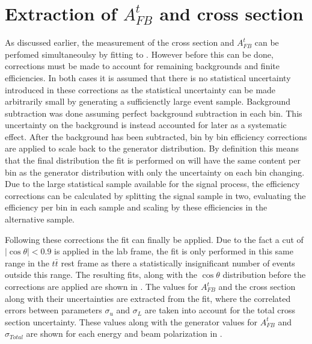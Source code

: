 \section{Extraction of $A_{FB}^t$ and cross section}
As discussed earlier, the measurement of the cross section and $A_{FB}^t$ can be perfomed simultaneoulsy by fitting to . However before this can be done, corrections must be made to account for remaining backgrounds and finite efficiencies. In both cases it is assumed that there is no statistical uncertainty introduced in these corrections as the statistical uncertainty can be made arbitrarily small by generating a sufficienctly large event sample. Background subtraction was done assuming perfect background subtraction in each bin. This uncertainty on the background is instead accounted for later as a systematic effect. After the background has been subtracted, bin by bin efficiency corrections are applied to scale back to the generator distribution. By definition this means that the final distribution the fit is performed on will have the same content per bin as the generator distribution with only the uncertainty on each bin changing. Due to the large statistical sample available for the signal process, the efficiency corrections can be calculated by splitting the signal sample in two, evaluating the efficiency per bin in each sample and scaling by these efficiencies in the alternative sample.

Following these corrections the fit can finally be applied. Due to the fact a cut of $\mid\cos\theta\mid < 0.9$ is applied in the lab frame, the fit is only performed in this same range in the $t\bar{t}$ rest frame as there a statistically insignificant number of events outside this range. The resulting fits, along with the $\cos\theta$ distribution before the corrections are applied are shown in . The values for $A_{FB}^t$ and the cross section along with their uncertainties are extracted from the fit, where the correlated errors between parameters $\sigma_u$ and $\sigma_L$ are taken into account for the total cross section uncertainty. These values along with the generator values for $A_{FB}^t$ and $\sigma_{Total}$ are shown for each energy and beam polarization in .


